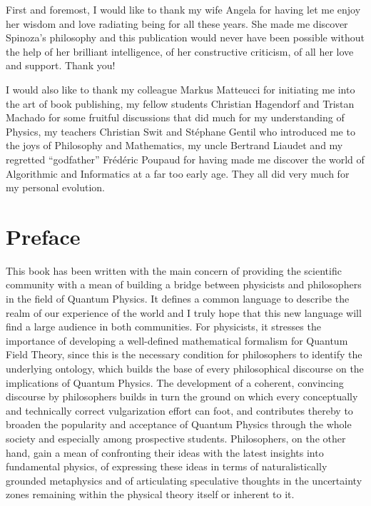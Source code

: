 \documentclass[10pt,a4paper,twoside,openany]{book}
\begin{document}
First and foremost, I would like to thank my wife Angela for having let me enjoy her wisdom and love radiating being for all these years. She made me discover Spinoza's philosophy and this publication would never have been possible without the help of her brilliant intelligence, of her constructive criticism, of all her love and support. Thank you!

I would also like to thank my colleague Markus Matteucci for initiating me into the art of book publishing, my fellow students Christian Hagendorf and Tristan Machado for some fruitful discussions that did much for my understanding of Physics, my teachers Christian Swit and Stéphane Gentil who introduced me to the joys of Philosophy and Mathematics, my uncle Bertrand Liaudet and my regretted ``godfather'' Frédéric Poupaud for having made me discover the world of Algorithmic and Informatics at a far too early age. They all did very much for my personal evolution.

\cleardoublepage
\section*{Preface}

This book has been written with the main concern of providing the scientific community with a mean of building a bridge between physicists and philosophers in the field of Quantum Physics. It defines a common language to describe the realm of our experience of the world and I truly hope that this new language will find a large audience in both communities. For physicists, it stresses the importance of developing a well-defined mathematical formalism for Quantum Field Theory, since this is the necessary condition for philosophers to identify the underlying ontology, which builds the base of every philosophical discourse on the implications of Quantum Physics. The development of a coherent, convincing discourse by philosophers builds in turn the ground on which every conceptually and technically correct vulgarization effort can foot, and contributes thereby to broaden the popularity and acceptance of Quantum Physics through the whole society and especially among prospective students. Philosophers, on the other hand, gain a mean of confronting their ideas with the latest insights into fundamental physics, of expressing these ideas in terms of naturalistically grounded metaphysics and of articulating speculative thoughts in the uncertainty zones remaining within the physical theory itself or inherent to it.
\end{document}
